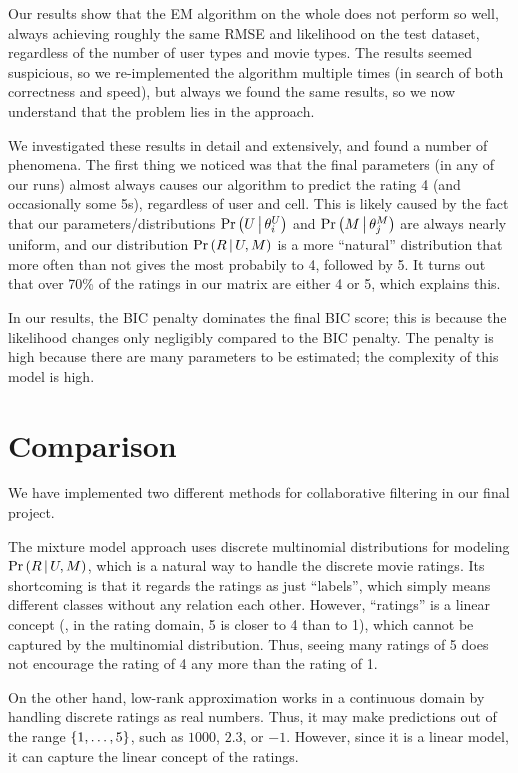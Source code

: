 \documentclass{article}
\begin{document}
Our results show that the EM algorithm on the whole does not perform
so well, always achieving roughly the same RMSE and likelihood on the
test dataset, regardless of the number of user types and movie types.
The results seemed suspicious, so we re-implemented the algorithm
multiple times (in search of both correctness and speed), but always
we found the same results, so we now understand that the problem lies
in the approach.

We investigated these results in detail and extensively, and
found a number of phenomena. The first thing we noticed was that the
final parameters (in any of our runs) almost always causes our
algorithm to predict the rating 4 (and occasionally some 5s),
regardless of user and cell. This is likely caused by the fact that
our parameters/distributions ${{\Pr \left(  U \,\middle|\, \theta^U_i  \right)}}$ and
${{\Pr \left(  M \,\middle|\, \theta^M_j  \right)}}$ are always nearly uniform, and our distribution
${{\Pr \left(  R \,\middle|\, U,M  \right)}}$ is a more ``natural'' distribution that more often than
not gives the most probabily to 4, followed by 5. It turns out that
over 70\% of the ratings in our matrix are either 4 or 5, which
explains this.

In our results, the BIC penalty dominates the final BIC score; this is
because the likelihood changes only negligibly compared to the BIC
penalty. The penalty is high because there are many parameters to be
estimated; the complexity of this model is high.



\section{Comparison}
\label{sec:comparison}
We have implemented two different methods for collaborative filtering in our final project.

The mixture model approach uses discrete multinomial distributions for modeling ${{\Pr \left(  R \,\middle|\, U,M  \right)}}$, which is a natural way to handle the discrete movie ratings. Its shortcoming is that it regards the ratings as just ``labels'', which simply means different classes without any relation each other. However, ``ratings'' is a linear concept (\ie, in the rating domain, 5 is closer to 4 than to 1), which cannot be captured by the multinomial distribution. Thus, seeing many ratings of 5 does not encourage the rating of 4 any more than the rating of 1.

On the other hand, low-rank approximation works in a continuous domain by handling discrete ratings as real numbers. Thus, it may make predictions out of the range ${\left\{ 1, \dots, 5 \right\}}$, such as $1000$, $2.3$, or $-1$. However, since it is a linear model, it can capture the linear concept of the ratings.
\end{document}

